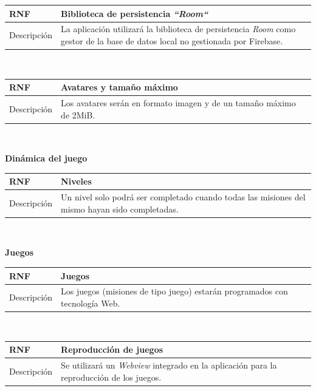 \documentclass[twoside]{report}
\newcommand\addrow[2]{#1 &#2\\ }
\newcommand\addheading[2]{#1 &#2\\ \hline}
\newcommand\tabularhead{\begin{tabular}{lp{0.7\textwidth}}
\hline
}
\newenvironment{req}{\tabularhead}
{\hline\end{tabular}}
\begin{document}
\vspace{0.25cm}

\begin{req}
	\addheading{\textbf{RNF\arabic{nonFunctionalRequirements}}}{Biblioteca de persistencia \textit{“Room“}}
	\addrow{Descripción}{La aplicación utilizará la biblioteca de persistencia \textit{Room} \cite{roompersistence} como gestor de la base de datos local no gestionada por Firebase.}
\end{req}\\

\begin{req}
	\addheading{\textbf{RNF\arabic{nonFunctionalRequirements}}}{Avatares y tamaño máximo}
	\addrow{Descripción}{Los avatares serán en formato imagen y de un tamaño máximo de 2MiB.}
\end{req}\\

\vspace{1cm}


\textbf{Dinámica del juego}

\begin{req}
	\addheading{\textbf{RNF\arabic{nonFunctionalRequirements}}}{Niveles}
	\addrow{Descripción}{Un nivel solo podrá ser completado cuando todas las misiones del mismo hayan sido completadas.}
\end{req}\\

\vspace{1cm}

\textbf{Juegos}\\

\begin{req}
	\addheading{\textbf{RNF\arabic{nonFunctionalRequirements}}}{Juegos}
	\addrow{Descripción}{Los juegos (misiones de tipo juego) estarán programados con tecnología Web.}
\end{req}\\

\vspace{0.25cm}

\begin{req}
	\addheading{\textbf{RNF\arabic{nonFunctionalRequirements}}}{Reproducción de juegos}
	\addrow{Descripción}{Se utilizará un \textit{Webview} integrado en la aplicación para la reproducción de los juegos.}
\end{req}\\
\end{document}
